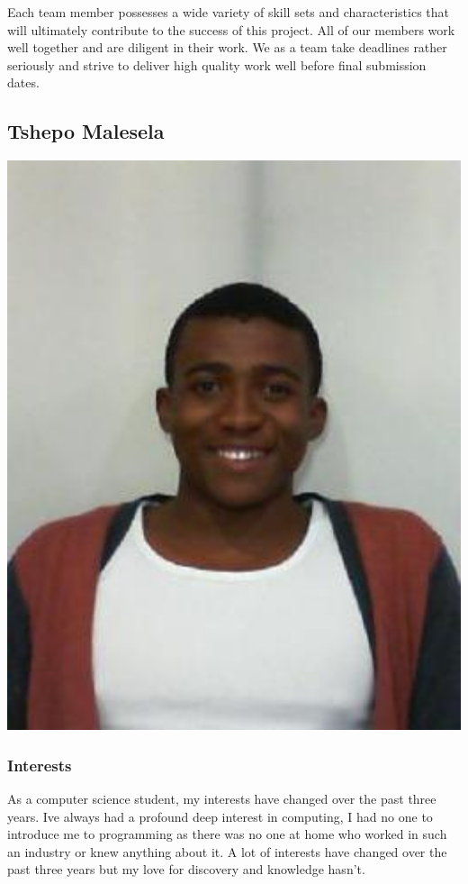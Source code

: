 \documentclass[a4paper,12pt]{article}
\begin{document}
	{\noindent}Each team member possesses a wide variety of skill sets and characteristics that will ultimately contribute to the success of this project. All of our members work well together and are diligent in their work. We as a team take deadlines rather seriously and strive to deliver high quality work well before final submission dates.  
	
		\newpage
		\subsection{Tshepo Malesela}
		\includegraphics[width=1\textwidth]{./Pictures/Tshepo.jpeg}\\
			\subsubsection{Interests}
			As a computer science student, my interests have changed over the past three years. Ive always had a profound deep interest in computing, I had no one to introduce me to programming as there was no one at home who worked in such an industry or knew anything about it. A lot of interests have changed over the past three years but my love for discovery and knowledge hasn't.
			
\end{document}
